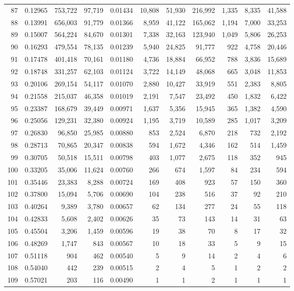 \begin{landscape}
\begin{longtable}{rrrrrrrrrrr}
87 & 0.12965 & 753,722 & 97,719 & 0.01434 & 10,808 & 51,930 & 216,992 & 1,335 & 8,335 & 41,588 \\
88 & 0.13991 & 656,003 & 91,779 & 0.01366 & 8,959 & 41,122 & 165,062 & 1,194 & 7,000 & 33,253 \\
89 & 0.15007 & 564,224 & 84,670 & 0.01301 & 7,338 & 32,163 & 123,940 & 1,049 & 5,806 & 26,253 \\
90 & 0.16293 & 479,554 & 78,135 & 0.01239 & 5,940 & 24,825 & 91,777 & 922 & 4,758 & 20,446 \\
91 & 0.17478 & 401,418 & 70,161 & 0.01180 & 4,736 & 18,884 & 66,952 & 788 & 3,836 & 15,689 \\
92 & 0.18748 & 331,257 & 62,103 & 0.01124 & 3,722 & 14,149 & 48,068 & 665 & 3,048 & 11,853 \\
93 & 0.20106 & 269,154 & 54,117 & 0.01070 & 2,880 & 10,427 & 33,919 & 551 & 2,383 & 8,805 \\
94 & 0.21558 & 215,037 & 46,358 & 0.01019 & 2,191 & 7,547 & 23,492 & 450 & 1,832 & 6,422 \\
95 & 0.23387 & 168,679 & 39,449 & 0.00971 & 1,637 & 5,356 & 15,945 & 365 & 1,382 & 4,590 \\
96 & 0.25056 & 129,231 & 32,380 & 0.00924 & 1,195 & 3,719 & 10,589 & 285 & 1,017 & 3,209 \\
97 & 0.26830 & 96,850 & 25,985 & 0.00880 & 853 & 2,524 & 6,870 & 218 & 732 & 2,192 \\
98 & 0.28713 & 70,865 & 20,347 & 0.00838 & 594 & 1,672 & 4,346 & 162 & 514 & 1,459 \\
99 & 0.30705 & 50,518 & 15,511 & 0.00798 & 403 & 1,077 & 2,675 & 118 & 352 & 945 \\
100 & 0.33205 & 35,006 & 11,624 & 0.00760 & 266 & 674 & 1,597 & 84 & 234 & 594 \\
101 & 0.35446 & 23,383 & 8,288 & 0.00724 & 169 & 408 & 923 & 57 & 150 & 360 \\
102 & 0.37800 & 15,094 & 5,706 & 0.00690 & 104 & 238 & 516 & 37 & 92 & 210 \\
103 & 0.40264 & 9,389 & 3,780 & 0.00657 & 62 & 134 & 277 & 24 & 55 & 118 \\
104 & 0.42833 & 5,608 & 2,402 & 0.00626 & 35 & 73 & 143 & 14 & 31 & 63 \\
105 & 0.45504 & 3,206 & 1,459 & 0.00596 & 19 & 38 & 70 & 8 & 17 & 32 \\
106 & 0.48269 & 1,747 & 843 & 0.00567 & 10 & 18 & 33 & 5 & 9 & 15 \\
107 & 0.51118 & 904 & 462 & 0.00540 & 5 & 9 & 14 & 2 & 4 & 6 \\
108 & 0.54040 & 442 & 239 & 0.00515 & 2 & 4 & 5 & 1 & 2 & 2 \\
109 & 0.57021 & 203 & 116 & 0.00490 & 1 & 1 & 2 & 1 & 1 & 1 \\
\end{longtable}
\end{landscape}
